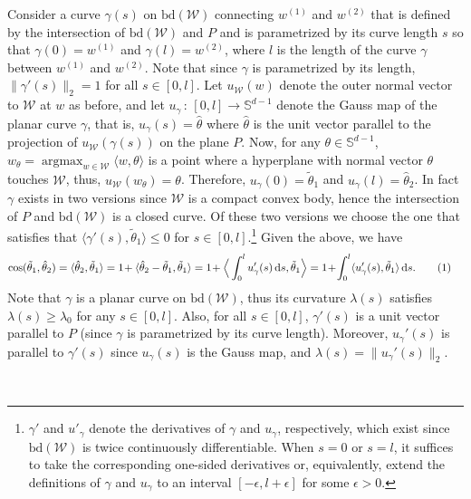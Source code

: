 \documentclass[english]{article}
\newcommand{\cW}{\mathcal{W}}
\newcommand{\bS}{\mathbb{S}}
\newcommand{\inpro}[2]{\langle #1, #2\rangle}
\newcommand{\ip}[1]{\langle#1\rangle}
\newcommand{\ttheta}{\tilde{\theta}}
\newcommand{\htheta}{\hat{\theta}}
\newcommand{\bd}{\mathrm{bd}}
\newcommand{\inangle}[2]{(#1,#2)}
\newcommand\numberthis{\addtocounter{equation}{1}\tag{\theequation}}
\DeclareMathOperator*{\argmax}{argmax}
\newenvironment{proofof}[1]{\par\noindent{\bf Proof of #1\ }}{\hfill\BlackBox\\[2mm]}
\begin{document}
\begin{proofof}{\cref{thm:R_curvesurface}}
Consider a curve $\gamma(s)$ on $\bd(\cW)$ connecting $w^{(1)}$ and $w^{(2)}$ that is defined by the intersection of $\bd(\cW)$ and $P$ and is parametrized by its curve length $s$ so that $\gamma(0) = w^{(1)}$ and $\gamma(l) = w^{(2)}$, where $l$ is the length of the curve $\gamma$ between $w^{(1)}$ and $w^{(2)}$.
Note that since $\gamma$ is parametrized by its length, $\|\gamma'(s)\|_2 = 1$ for all $s \in [0,l]$. 
Let $u_{\cW}(w)$ denote the outer normal vector to $\cW$ at $w$ as before,
and let $u_\gamma\, : \, [0,l]\rightarrow \bS^{d-1}$ denote the Gauss map of the planar curve $\gamma$, that is, $u_\gamma(s) = \htheta$ where $\htheta$ is the unit vector parallel to the projection of $u_{\cW}(\gamma(s))$ on the plane $P$. 
Now, for any $\theta \in \bS^{d-1}$, $w_\theta=\argmax_{w \in \cW} \inpro{w}{\theta}$ is a point where a hyperplane with normal vector $\theta$ touches $\cW$, thus, $u_{\cW}(w_\theta)=\theta$.
Therefore, $u_\gamma(0) = \ttheta_1$ and $u_\gamma(l) = \htheta_2$.
In fact $\gamma$ exists in two versions since $\cW$ is a compact convex body,
hence the intersection of $P$ and $\bd(\cW)$ is a closed curve.
Of these two versions we choose the one that satisfies that $\ip{\gamma'(s),\ttheta_1}\le 0$ for $s\in [0,l]$.\footnote{$\gamma'$ and $u'_\gamma$ denote the derivatives of $\gamma$ and $u_\gamma$, respectively, which exist since $\bd(\cW)$ is twice continuously differentiable. When $s=0$ or $s=l$, it suffices to take the corresponding one-sided derivatives or, equivalently, extend the definitions of $\gamma$ and $u_\gamma$ to an interval $[-\epsilon,l+\epsilon]$ for some $\epsilon>0$.}
Given the above, we have
\begin{align*}
\cos \inangle{\ttheta_1}{\htheta_2} & = \inpro{\htheta_2}{\ttheta_1} 
	 = 1 \! + \inpro{\htheta_2 - \ttheta_1}{\ttheta_1} 
	  = 1\!+ \Big\langle\int_{0}^{l} u_\gamma'(s)\,\text{d}s, \ttheta_1 \Big\rangle
	 = 1\!+ \!\int_{0}^{l} \inpro{u_\gamma'(s)}{\ttheta_1} \,\text{d}s. \numberthis \label{eq:cosint}
\end{align*}
Note that $\gamma$ is a planar curve on $\bd(\cW)$, 
thus its curvature $\lambda(s)$ satisfies $\lambda(s) \ge \lambda_0$ for any $s\in [0,l]$.
Also, for all $s \in [0,l]$, $\gamma'(s)$ is a unit vector parallel to $P$ (since $\gamma$ is parametrized by its curve length). 
Moreover, $u_\gamma'(s)$ is parallel to $\gamma'(s)$ since $u_{\gamma}(s)$ is the Gauss map, and $\lambda(s) = \|u_\gamma'(s)\|_2$.

\end{proofof}
\end{document}
